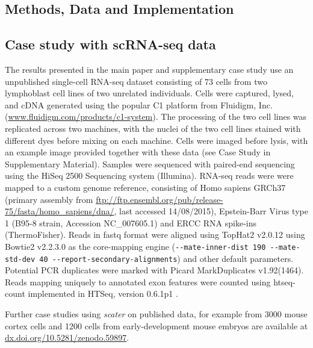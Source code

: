 \documentclass{bioinfo}
\begin{document}
\begin{methods}
\section{Methods, Data and Implementation}\label{methods-data-and-implementation}

\subsection{Case study with scRNA-seq data}\label{case-study-with-scrna-seq-data}

The results presented in the main paper and supplementary case study use an unpublished single-cell RNA-seq dataset consisting of 73 cells from two lymphoblast cell lines of two unrelated individuals. Cells were captured, lysed, and cDNA generated using the popular C1 platform from Fluidigm, Inc. (\href{https://www.fluidigm.com/products/c1-system}{www.fluidigm.com/products/c1-system}). The processing of the two cell lines was replicated across two machines, with the nuclei of the two cell lines stained with different dyes before mixing on each machine. Cells were imaged before lysis, with an example image provided together with these data (see Case Study in Supplementary Material). Samples were sequenced with paired-end sequencing using the HiSeq 2500 Sequencing system (Illumina). RNA-seq reads were were mapped to a custom genome reference, consisting of Homo sapiens GRCh37 (primary assembly from \href{ftp://ftp.ensembl.org/pub/release-75/fasta/homo_sapiens/dna/}{ftp://ftp.ensembl.org/pub/release-75/fasta/homo_sapiens/dna/}, last accessed 14/08/2015), Epstein-Barr Virus type 1 (B95-8 strain, Accession NC\_007605.1) and ERCC RNA spike-ins (ThermoFisher).  Reads in fastq format were aligned using TopHat2 v2.0.12 \citep{Kim2013-qb} using Bowtie2 v2.2.3.0 \citep{Langmead2012-yc} as the core-mapping engine (\verb|--mate-inner-dist 190 --mate-std-dev 40 --report-secondary-alignments|) and other default parameters. Potential PCR duplicates were marked with Picard MarkDuplicates v1.92(1464). Reads mapping uniquely to annotated exon features were counted using htseq-count implemented in HTSeq, version 0.6.1p1 \citep{Anders2015-wf}.

Further case studies using \emph{scater} on published data, for example from 3000 mouse cortex cells \citep{Zeisel2015-ab} and 1200 cells from early-development mouse embryos \citep{Scialdone2016-oa} are available at \href{http://dx.doi.org/10.5281/zenodo.59897}{dx.doi.org/10.5281/zenodo.59897}.


\end{methods}
\end{document}
